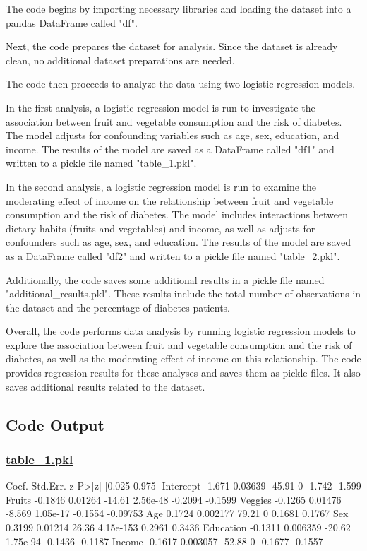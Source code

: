 \documentclass[11pt]{article}
\begin{document}
The code begins by importing necessary libraries and loading the dataset into a pandas DataFrame called "df".

Next, the code prepares the dataset for analysis. Since the dataset is already clean, no additional dataset preparations are needed.

The code then proceeds to analyze the data using two logistic regression models.

In the first analysis, a logistic regression model is run to investigate the association between fruit and vegetable consumption and the risk of diabetes. The model adjusts for confounding variables such as age, sex, education, and income. The results of the model are saved as a DataFrame called "df1" and written to a pickle file named "table\_1.pkl".

In the second analysis, a logistic regression model is run to examine the moderating effect of income on the relationship between fruit and vegetable consumption and the risk of diabetes. The model includes interactions between dietary habits (fruits and vegetables) and income, as well as adjusts for confounders such as age, sex, and education. The results of the model are saved as a DataFrame called "df2" and written to a pickle file named "table\_2.pkl".

Additionally, the code saves some additional results in a pickle file named "additional\_results.pkl". These results include the total number of observations in the dataset and the percentage of diabetes patients.

Overall, the code performs data analysis by running logistic regression models to explore the association between fruit and vegetable consumption and the risk of diabetes, as well as the moderating effect of income on this relationship. The code provides regression results for these analyses and saves them as pickle files. It also saves additional results related to the dataset.

\subsection{Code Output}\hypertarget{file-table-1-pkl}{}

\subsubsection*{\hyperlink{code-Data Analysis-table-1-pkl}{table\_1.pkl}}

\begin{codeoutput}
            Coef. Std.Err.      z      P>|z|  [0.025   0.975]
Intercept  -1.671  0.03639 -45.91          0  -1.742   -1.599
Fruits    -0.1846  0.01264 -14.61   2.56e-48 -0.2094  -0.1599
Veggies   -0.1265  0.01476 -8.569   1.05e-17 -0.1554 -0.09753
Age        0.1724 0.002177  79.21          0  0.1681   0.1767
Sex        0.3199  0.01214  26.36  4.15e-153  0.2961   0.3436
Education -0.1311 0.006359 -20.62   1.75e-94 -0.1436  -0.1187
Income    -0.1617 0.003057 -52.88          0 -0.1677  -0.1557
\end{codeoutput}\hypertarget{file-table-2-pkl}{}
\end{document}
